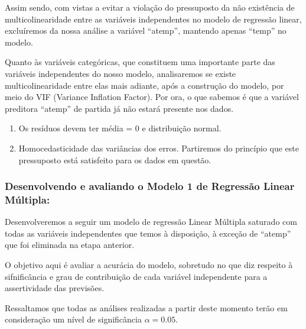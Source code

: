 \documentclass[
  letterpaper,
  DIV=11,
  numbers=noendperiod]{scrartcl}
\begin{document}
Assim sendo, com vistas a evitar a violação do pressuposto da não
existência de multicolinearidade entre as variáveis independentes no
modelo de regressão linear, excluíremos da nossa análise a variável
``atemp'', mantendo apenas ``temp'' no modelo.

Quanto às variáveis categóricas, que constituem uma importante parte das
variáveis independentes do nosso modelo, analisaremos se existe
multicolinearidade entre elas mais adiante, após a construção do modelo,
por meio do VIF (Variance Inflation Factor). Por ora, o que sabemos é
que a variável preditora ``atemp'' de partida já não estará presente nos
dados.

\begin{enumerate}
\def\labelenumi{\arabic{enumi})}
\setcounter{enumi}{1}
\item
  Os resíduos devem ter média = 0 e distribuição normal.
\item
  Homocedasticidade das variâncias dos erros. Partiremos do princípio
  que este pressuposto está satisfeito para os dados em questão.
\end{enumerate}

\subsubsection{Desenvolvendo e avaliando o Modelo 1 de Regressão Linear
Múltipla:}\label{desenvolvendo-e-avaliando-o-modelo-1-de-regressuxe3o-linear-muxfaltipla}

Desenvolveremos a seguir um modelo de regressão Linear Múltipla saturado
com todas as variáveis independentes que temos à disposição, à exceção
de ``atemp'' que foi eliminada na etapa anterior.

O objetivo aqui é avaliar a acurácia do modelo, sobretudo no que diz
respeito à sifnificância e grau de contribuição de cada variável
independente para a assertividade das previsões.

Ressaltamos que todas as análises realizadas a partir deste momento
terão em consideração um nível de significância \(\alpha = 0.05\).
\end{document}
